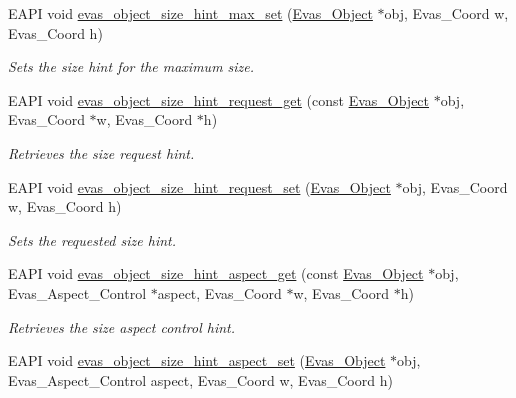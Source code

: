 \begin{DoxyCompactItemize}
EAPI void \hyperlink{group__Evas__Object__Group__Size__Hints_ga2a224fd6c4fc231af281af59c5a604b2}{evas\_\-object\_\-size\_\-hint\_\-max\_\-set} (\hyperlink{group__Evas__Object__Group_ga9e19e6dd1f517a0ba437c0114d3e7c97}{Evas\_\-Object} $\ast$obj, Evas\_\-Coord w, Evas\_\-Coord h)
\begin{DoxyCompactList}\small\item\em Sets the size hint for the maximum size. \item\end{DoxyCompactList}\item 
EAPI void \hyperlink{group__Evas__Object__Group__Size__Hints_ga6a7de6942258ab03a6e85b37f569895d}{evas\_\-object\_\-size\_\-hint\_\-request\_\-get} (const \hyperlink{group__Evas__Object__Group_ga9e19e6dd1f517a0ba437c0114d3e7c97}{Evas\_\-Object} $\ast$obj, Evas\_\-Coord $\ast$w, Evas\_\-Coord $\ast$h)
\begin{DoxyCompactList}\small\item\em Retrieves the size request hint. \item\end{DoxyCompactList}\item 
EAPI void \hyperlink{group__Evas__Object__Group__Size__Hints_gace0177af29ccbf1a60415f2c4c85c1f4}{evas\_\-object\_\-size\_\-hint\_\-request\_\-set} (\hyperlink{group__Evas__Object__Group_ga9e19e6dd1f517a0ba437c0114d3e7c97}{Evas\_\-Object} $\ast$obj, Evas\_\-Coord w, Evas\_\-Coord h)
\begin{DoxyCompactList}\small\item\em Sets the requested size hint. \item\end{DoxyCompactList}\item 
EAPI void \hyperlink{group__Evas__Object__Group__Size__Hints_ga7b31c73dcbf60cdafe6ad7ffae42a54c}{evas\_\-object\_\-size\_\-hint\_\-aspect\_\-get} (const \hyperlink{group__Evas__Object__Group_ga9e19e6dd1f517a0ba437c0114d3e7c97}{Evas\_\-Object} $\ast$obj, Evas\_\-Aspect\_\-Control $\ast$aspect, Evas\_\-Coord $\ast$w, Evas\_\-Coord $\ast$h)
\begin{DoxyCompactList}\small\item\em Retrieves the size aspect control hint. \item\end{DoxyCompactList}\item 
EAPI void \hyperlink{group__Evas__Object__Group__Size__Hints_gadb36ccc851e48ae2a11a6e2cb7fcb273}{evas\_\-object\_\-size\_\-hint\_\-aspect\_\-set} (\hyperlink{group__Evas__Object__Group_ga9e19e6dd1f517a0ba437c0114d3e7c97}{Evas\_\-Object} $\ast$obj, Evas\_\-Aspect\_\-Control aspect, Evas\_\-Coord w, Evas\_\-Coord h)

\end{DoxyCompactItemize}
